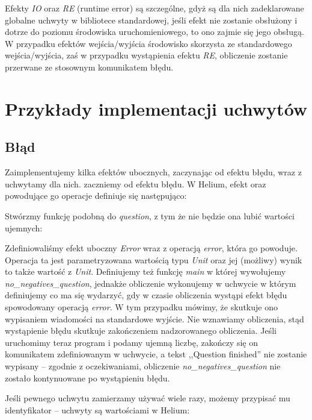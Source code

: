 Efekty \textit{IO} oraz \textit{RE} (runtime error) są szczególne, gdyż są dla nich zadeklarowane globalne uchwyty w bibliotece standardowej, jeśli efekt nie zostanie obsłużony i dotrze do poziomu środowiska uruchomieniowego, to ono zajmie się jego obsługą. W przypadku efektów wejścia/wyjścia środowisko skorzysta ze standardowego wejścia/wyjścia, zaś w przypadku wystąpienia efektu \textit{RE}, obliczenie zostanie przerwane ze stosownym komunikatem błędu.

\section{Przykłady implementacji uchwytów}

\subsection{Błąd}

Zaimplementujemy kilka efektów ubocznych, zaczynając od efektu błędu, wraz z uchwytamy dla nich. zaczniemy od efektu błędu. W Helium, efekt oraz powodujące go operacje definiuje się następująco:




Stwórzmy funkcję podobną do \textit{question}, z tym że nie będzie ona lubić wartości ujemnych:



Zdefiniowaliśmy efekt uboczny \textit{Error} wraz z operacją \textit{error}, która go powoduje. Operacja ta jest parametryzowana wartością typu \textit{Unit} oraz jej (możliwy) wynik to także wartość z \textit{Unit}. Definiujemy też funkcję \textit{main} w której wywołujemy \textit{no\_negatives\_question}, jednakże obliczenie wykonujemy w uchwycie w którym definiujemy co ma się wydarzyć, gdy w czasie obliczenia wystąpi efekt błędu spowodowany operacją \textit{error}. W tym przypadku mówimy, że skutkuje ono wypisaniem wiadomości na standardowe wyjście. Nie wznawiamy obliczenia, stąd wystąpienie błędu skutkuje zakończeniem nadzorowanego obliczenia. Jeśli uruchomimy teraz program i podamy ujemną liczbę, zakończy się on komunikatem zdefiniowanym w uchwycie, a tekst ,,Question finished'' nie zostanie wypisany -- zgodnie z oczekiwaniami, obliczenie \textit{no\_negatives\_question} nie zostało kontynuowane po wystąpieniu błędu.

Jeśli pewnego uchwytu zamierzamy używać wiele razy, możemy przypisać mu identyfikator -- uchwyty są wartościami w Helium:

